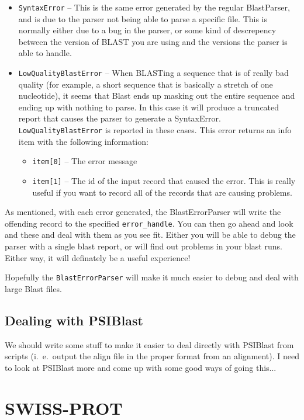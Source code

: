 \documentclass{report}
\begin{document}
\begin{itemize}
  \item \verb|SyntaxError| -- This is the same error generated by the regular BlastParser, and is due to the parser not being able to parse a specific file. This is normally either due to a bug in the parser, or some kind of descrepency between the version of BLAST you are using and the versions the parser is able to handle.

  \item \verb|LowQualityBlastError| -- When BLASTing a sequence that is of really bad quality (for example, a short sequence that is basically a stretch of one nucleotide), it seems that Blast ends up masking out the entire sequence and ending up with nothing to parse. In this case it will produce a truncated report that causes the parser to generate a SyntaxError. \verb|LowQualityBlastError| is reported in these cases. This error returns an info item with the following information:
  \begin{itemize}
    \item \verb|item[0]| -- The error message
    \item \verb|item[1]| -- The id of the input record that caused the error. This is really useful if you want to record all of the records that are causing problems.
  \end{itemize}
\end{itemize}

As mentioned, with each error generated, the BlastErrorParser will write the offending record to the specified \verb|error_handle|. You can then go ahead and look and these and deal with them as you see fit. Either you will be able to debug the parser with a single blast report, or will find out problems in your blast runs. Either way, it will definately be a useful experience!


Hopefully the \verb|BlastErrorParser| will make it much easier to debug and deal with large Blast files.

\subsection{Dealing with PSIBlast}

We should write some stuff to make it easier to deal directly with PSIBlast from scripts (i.~e.~output the align file in the proper format from an alignment). I need to look at PSIBlast more and come up with some good ways of going this...

\section{SWISS-PROT}
\label{sec:swiss_prot}
\end{document}
